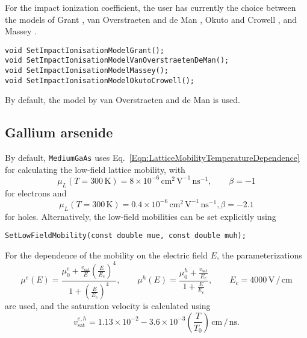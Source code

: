 For the impact ionization coefficient, the user has currently the choice 
between the models of Grant \cite{Grant1973},
van Overstraeten and de Man \cite{VanOverstraeten1970}, 
Okuto and Crowell \cite{Okuto1975}, and Massey \cite{Massey2006}.
\begin{lstlisting}
void SetImpactIonisationModelGrant();
void SetImpactIonisationModelVanOverstraetenDeMan();
void SetImpactIonisationModelMassey();
void SetImpactIonisationModelOkutoCrowell();
\end{lstlisting}
By default, the model by van Overstraeten and de Man is used.

 
\subsection{Gallium arsenide}
By default, \texttt{MediumGaAs} uses 
Eq.~\eqref{Eqn:LatticeMobilityTemperatureDependence} for calculating the 
low-field lattice mobility, with 
\begin{equation*}
\mu_{L}\left(T = 300\,\text{K}\right) = 8\times10^{-6}\,\text{cm}^{2}\,\text{V}^{-1}\,\text{ns}^{-1}, \qquad \beta=-1
\end{equation*}
for electrons and 
\begin{equation*}
\mu_{L}\left(T = 300\,\text{K}\right) = 0.4\times10^{-6}\,\text{cm}^{2}\,\text{V}^{-1}\,\text{ns}^{-1}, \beta=-2.1
\end{equation*}
for holes. Alternatively, the low-field mobilities can be set explicitly using
\begin{lstlisting}
SetLowFieldMobility(const double mue, const double muh);
\end{lstlisting}
For the dependence of the mobility on the electric field $E$, the 
parameterizations \cite{Barnes1976} 
\begin{equation*}
  \mu^{e}\left(E\right) = \frac{\mu_{0}^{e} + \frac{v_{\text{sat}}}{E}\left(\frac{E}{E_{c}}\right)^{4}}{1 + \left(\frac{E}{E_{c}}\right)^4}, \qquad
  \mu^{h}\left(E\right) = \frac{\mu_{0}^{h} + \frac{v_{\text{sat}}}{E_{c}}}{1 + \frac{E}{E_{c}}}, \qquad E_{c} = 4000\,\text{V}\,/\,\text{cm}
\end{equation*}
are used, and the saturation velocity is calculated using
\begin{equation*}
  v_{\text{sat}}^{e,h} = 1.13\times10^{-2} - 3.6\times10^{-3}\left(\frac{T}{T_{0}}\right)\,\text{cm}\,/\,\text{ns}. 
\end{equation*}

